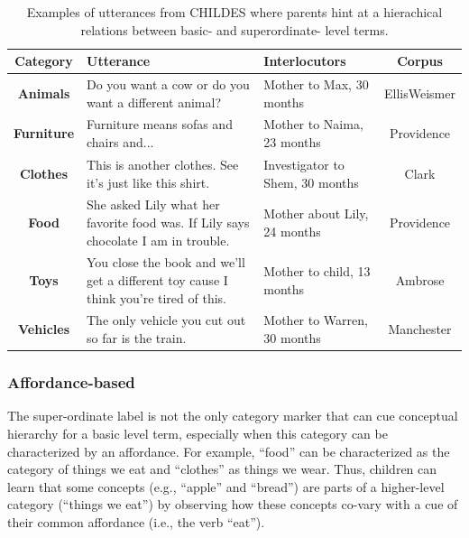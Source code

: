 \documentclass[english,,man,floatsintext]{apa6}
\begin{document}
\begin{table}[!htbp] \centering 
\begin{tabularx}{\linewidth}{cXXc}
\hline
\textbf{Category} & Utterance & Interlocutors & Corpus\\
\hline

\textbf{Animals} & Do you want a cow or do you want a different animal? & Mother to Max, 30 months & EllisWeismer\\

\textbf{Furniture} & Furniture means sofas and chairs and... & Mother to Naima, 23 months & Providence\\

\textbf{Clothes} & This is another clothes. See it's just like this shirt. & Investigator to Shem, 30 months & Clark\\

\textbf{Food} & She asked Lily what her favorite food was. If Lily says chocolate I am in trouble. & Mother about Lily, 24 months & Providence\\

\textbf{Toys} & You close the book and we'll get a different toy cause I think you're tired of this. & Mother to child, 13 months & Ambrose\\

\textbf{Vehicles} & The only vehicle you cut out so far is the train. & Mother to Warren, 30 months & Manchester\\

\hline
\end{tabularx}
\caption{\label{tab:pragmatic} Examples of utterances from CHILDES where parents hint at a hierachical relations between basic- and superordinate- level terms.}
\end{table}

\hypertarget{affordance-based}{%
\subsubsection{Affordance-based}\label{affordance-based}}

The super-ordinate label is not the only category marker that can cue conceptual hierarchy for a basic level term, especially when this category can be characterized by an affordance. For example, \enquote{food} can be characterized as the category of things we eat and \enquote{clothes} as things we wear. Thus, children can learn that some concepts (e.g., \enquote{apple} and \enquote{bread}) are parts of a higher-level category (\enquote{things we eat}) by observing how these concepts co-vary with a cue of their common affordance (i.e., the verb \enquote{eat}).
\end{document}
